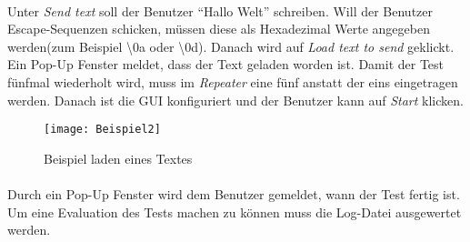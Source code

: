 \newpage

\paragraph{}
Unter \textit{Send text} soll der Benutzer "`Hallo Welt"' schreiben. Will der Benutzer Escape-Sequenzen schicken, müssen diese als Hexadezimal Werte angegeben werden(zum Beispiel \textbackslash0a oder \textbackslash0d). Danach wird auf \textit{Load text to send} geklickt. Ein Pop-Up Fenster meldet, dass der Text geladen worden ist. Damit der Test fünfmal wiederholt wird, muss im \textit{Repeater} eine fünf anstatt der eins eingetragen werden. Danach ist die GUI konfiguriert und der Benutzer kann auf \textit{Start} klicken.\\ %

\begin{figure}[h]
  \begin{center}
    \texttt{[image: Beispiel2]}
  		  \caption{Beispiel laden eines Textes}
     \label{Beispielbild 2}
  \end{center}
\end{figure}

\paragraph{}
Durch ein Pop-Up Fenster wird dem Benutzer gemeldet, wann der Test fertig ist. Um eine Evaluation des Tests machen zu können muss die Log-Datei ausgewertet werden.

